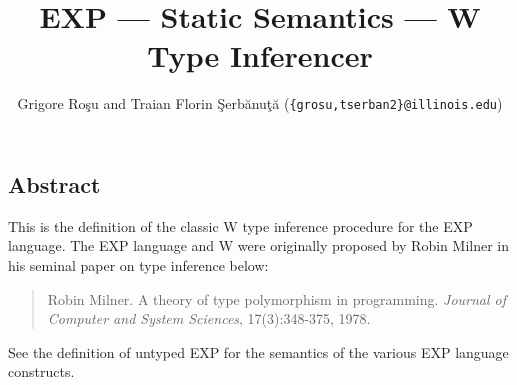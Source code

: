\setlength{\parindent}{1em}
\title{EXP --- Static Semantics --- W Type Inferencer}
\author{Grigore Ro\c{s}u and
        Traian Florin \c{S}erb\u{a}nu\c{t}\u{a}
	(\texttt{\{grosu,tserban2\}@illinois.edu})}

\maketitle

\begin{latexComment}
\section{Abstract}
This is the \K definition of the classic W type inference procedure
for the EXP language.  The EXP language and W were originally proposed
by Robin Milner in his seminal paper on type inference below:
\begin{quote}
Robin Milner. A theory of type polymorphism in programming.
{\em Journal of Computer and System Sciences}, 17(3):348-375, 1978.
\end{quote}
See the \K definition of untyped EXP for the semantics of the various
EXP language constructs.
\end{latexComment}

\vspace*{3ex}


